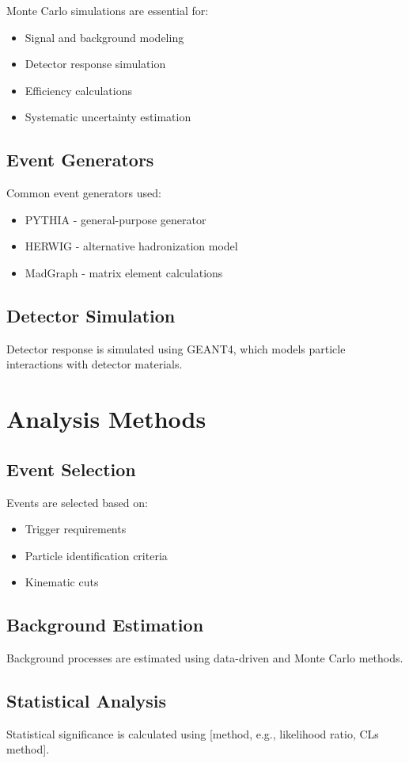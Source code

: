 Monte Carlo simulations are essential for:
\begin{itemize}
  \item Signal and background modeling
  \item Detector response simulation
  \item Efficiency calculations
  \item Systematic uncertainty estimation
\end{itemize}

\subsection{Event Generators}

Common event generators used:
\begin{itemize}
  \item PYTHIA - general-purpose generator
  \item HERWIG - alternative hadronization model
  \item MadGraph - matrix element calculations
\end{itemize}

\subsection{Detector Simulation}

Detector response is simulated using GEANT4, which models particle interactions with detector materials.

\section{Analysis Methods}

\subsection{Event Selection}

Events are selected based on:
\begin{itemize}
  \item Trigger requirements
  \item Particle identification criteria
  \item Kinematic cuts
\end{itemize}

\subsection{Background Estimation}

Background processes are estimated using data-driven and Monte Carlo methods.

\subsection{Statistical Analysis}

Statistical significance is calculated using [method, e.g., likelihood ratio, CLs method].
